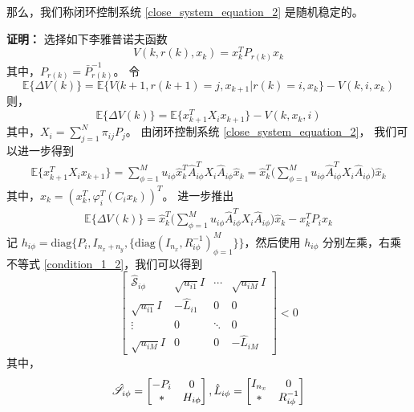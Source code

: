 	那么，我们称闭环控制系统 \eqref{close_system_equation_2} 是随机稳定的。
	
	{\bf 证明：} 选择如下李雅普诺夫函数
	\begin{equation}\label{lyapunov_funciton} 
	V(k,r(k),x_k)=x^{T}_{k}P_{r(k)}x_{k}
	\end{equation}
	其中，$P_{r(k)}=\bar{P}^{-1}_{r(k)}$。 令 
	\begin{equation*}
		\mathbb{E}\{\varDelta V(k)\}=\mathbb{E}\{V(k+1,r(k+1)=j,x_{k+1}|r(k)=i,x_k \}-V(k,i,x_k)
	\end{equation*}
	则，
	\begin{equation} \label{lypfunction}
	\mathbb{E}\{\varDelta V(k)\}=\mathbb{E}\{x^{T}_{k+1}X_{i} x_{k+1} \}-V(k,x_k,i)
	\end{equation} 
	其中，$X_{i} = \sum_{j=1}^{N}\pi_{ij}P_{j}$。 由闭环控制系统 \eqref{close_system_equation_2}， 我们可以进一步得到
	\begin{equation}
	\begin{split}
	\mathbb{E}\{x^{T}_{k+1}X_{i} x_{k+1} \} = \sum_{\phi=1}^{M} u_{i\phi} \hat{x}^{T}_{k} \hat{A}^{T}_{i\phi}X_{i}\hat{A}_{i\phi}\hat{x}_{k} =\hat{x}^{T}_{k} \Big( \sum_{\phi=1}^{M}u_{i\phi}\hat{A}^{T}_{i\phi}X_{i}\hat{A}_{i\phi}\Big) \hat{x}_{k} 
	\end{split}
	\end{equation}
	其中，$\hat{x}_{k}=(x^{T}_k,\varphi^{T}_{i}(C_{i}x_{k}))^{T}$。 进一步推出
	\begin{equation} \label{leq18}
	\begin{split}
	\mathbb{E}\{\varDelta V(k)\}=\hat{x}^{T}_{k} \Big( \sum_{\phi=1}^{M}u_{i\phi}\hat{A}^{T}_{i\phi}X_{i}\hat{A}_{i\phi}\Big) \hat{x}_{k} -x^{T}_{k}P_{i}x_{k}
	\end{split}
	\end{equation}
	记 $h_{i\phi} = \mathrm{diag}\Big\{P_{i}, I_{n_x+n_y},\{\mathrm{diag}(I_{n_x},R^{-1}_{i\phi})^{M}_{\phi=1} \} \Big\}$，然后使用 $h_{i\phi}$ 分别左乘，右乘不等式 \eqref{condition_1_2}，我们可以得到
	\begin{equation}\label{st}
	\begin{bmatrix} 
	\hat{\mathscr{S}}_{i\phi}&
	\sqrt{u_{i1}}I&
	\cdots&
	\sqrt{u_{iM}}I\\
	\sqrt{u_{i1}}I&-\hat{L}_{i1}&0&0\\ 
	\vdots&0&\ddots&0\\
	\sqrt{u_{iM}}I&0&0&
	-\hat{L}_{iM}
	\end{bmatrix} <0
	\end{equation}
	其中，
	\begin{equation} \notag
	\begin{aligned}
	\hat{\mathscr{S}}_{i\phi}=\begin{bmatrix}
	-P_{i }&0\\
	*&H_{i\phi}
	\end{bmatrix},
	\hat{L}_{i\phi} = \begin{bmatrix}
	I_{n_x}&0\\
	*&R^{-1}_{i\phi}
	\end{bmatrix}
	\end{aligned}
	\end{equation}

